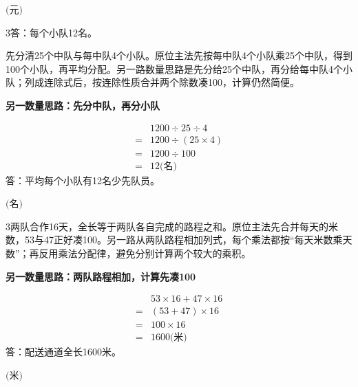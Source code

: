 \documentclass[multi=snippet,border={5bp 20bp 5bp 5bp}]{standalone}
\newenvironment{snippet}[3]{\begin{minipage}{#1bp}\color{answerred}\fontsize{#2}{#3}\selectfont\raggedright}{\end{minipage}}
\begin{document}
\begin{snippet}{80}{10.0}{14}\SourceSans\setlength{\mathindent}{2bp}\(\text{(元)}\)\end{snippet}
\begin{snippet}{505}{11.5}{14}\begin{multicols}{3}\raggedcolumns 答：每个小队12名。\par 先分清25个中队与每中队4个小队。原位主法先按每中队4个小队乘25个中队，得到100个小队，再平均分配。另一路数量思路是先分给25个中队，再分给每中队4个小队；列成连除式后，按连除性质合并两个除数凑100，计算仍然简便。\par \textbf{另一数量思路：先分中队，再分小队}\par \[\begin{aligned}&1200\div25\div4\\={}&1200\div(25\times4)\\={}&1200\div100\\={}&12\text{(名)}\end{aligned}\]答：平均每个小队有12名少先队员。\end{multicols}\end{snippet}
\begin{snippet}{80}{10.0}{14}\SourceSans\setlength{\mathindent}{2bp}\(\text{(名)}\)\end{snippet}
\begin{snippet}{505}{11.5}{14}\begin{multicols}{3}\raggedcolumns 两队合作16天，全长等于两队各自完成的路程之和。原位主法先合并每天的米数，53与47正好凑100。另一路从两队路程相加列式，每个乘法都按“每天米数乘天数”；再反用乘法分配律，避免分别计算两个较大的乘积。\par \textbf{另一数量思路：两队路程相加，计算先凑100}\par \[\begin{aligned}&53\times16+47\times16\\={}&(53+47)\times16\\={}&100\times16\\={}&1600\text{(米)}\end{aligned}\]答：配送通道全长1600米。\end{multicols}\end{snippet}
\begin{snippet}{80}{10.0}{14}\SourceSans\setlength{\mathindent}{2bp}\(\text{(米)}\)\end{snippet}
\end{document}
